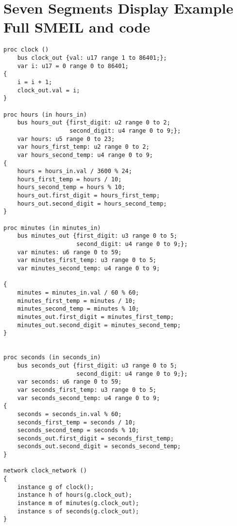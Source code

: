 \chapter{Seven Segments Display Example Full SMEIL and \cspm code}
\begin{verbatim}
proc clock ()
    bus clock_out {val: u17 range 1 to 86401;};
    var i: u17 = 0 range 0 to 86401;
{
    i = i + 1;
    clock_out.val = i;
}

proc hours (in hours_in)
    bus hours_out {first_digit: u2 range 0 to 2;
                   second_digit: u4 range 0 to 9;};
    var hours: u5 range 0 to 23;
    var hours_first_temp: u2 range 0 to 2;
    var hours_second_temp: u4 range 0 to 9;
{
    hours = hours_in.val / 3600 % 24;
    hours_first_temp = hours / 10;
    hours_second_temp = hours % 10;
    hours_out.first_digit = hours_first_temp;
    hours_out.second_digit = hours_second_temp;
}

proc minutes (in minutes_in)
    bus minutes_out {first_digit: u3 range 0 to 5;
                     second_digit: u4 range 0 to 9;};
    var minutes: u6 range 0 to 59;
    var minutes_first_temp: u3 range 0 to 5;
    var minutes_second_temp: u4 range 0 to 9;

{
    minutes = minutes_in.val / 60 % 60;
    minutes_first_temp = minutes / 10;
    minutes_second_temp = minutes % 10;
    minutes_out.first_digit = minutes_first_temp;
    minutes_out.second_digit = minutes_second_temp;
}


proc seconds (in seconds_in)
    bus seconds_out {first_digit: u3 range 0 to 5;
                     second_digit: u4 range 0 to 9;};
    var seconds: u6 range 0 to 59;
    var seconds_first_temp: u3 range 0 to 5;
    var seconds_second_temp: u4 range 0 to 9;
{
    seconds = seconds_in.val % 60;
    seconds_first_temp = seconds / 10;
    seconds_second_temp = seconds % 10;
    seconds_out.first_digit = seconds_first_temp;
    seconds_out.second_digit = seconds_second_temp;
}

network clock_network ()
{
    instance g of clock();
    instance h of hours(g.clock_out);
    instance m of minutes(g.clock_out);
    instance s of seconds(g.clock_out);
}

\end{verbatim}

